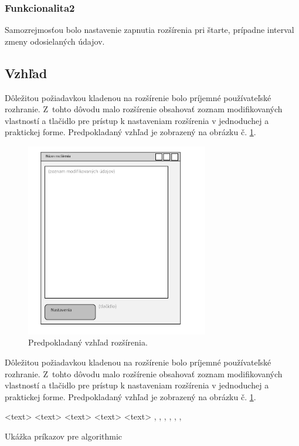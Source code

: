 \subsubsection{Funkcionalita2}
\noindent Samozrejmosťou bolo nastavenie zapnutia rozšírenia pri štarte, prípadne interval zmeny odosielaných údajov.

\subsection{Vzhľad}
\noindent Dôležitou požiadavkou kladenou na rozšírenie bolo príjemné používateľské rozhranie. Z~tohto dôvodu malo rozšírenie obsahovať zoznam modifikovaných vlastností a tlačidlo pre prístup k nastaveniam rozšírenia v jednoduchej a praktickej forme. Predpokladaný vzhľad je zobrazený na obrázku č. \ref{vzhladobr}.
\begin{figure}[!htbp]
  \centering
  \includegraphics[width=8cm]{img/vzhlad.png}
  \caption{Predpokladaný vzhľad rozšírenia.}
  \label{vzhladobr}
\end{figure}	 
\noindent Dôležitou požiadavkou kladenou na rozšírenie bolo príjemné používateľské rozhranie.\cite{t00} Z~tohto dôvodu malo rozšírenie obsahovať zoznam modifikovaných vlastností a tlačidlo pre prístup k nastaveniam rozšírenia v jednoduchej a praktickej forme. Predpokladaný vzhľad je zobrazený na obrázku č. \ref{vzhladobr}.

\begin{algorithm}
\scriptsize
\begin{algorithmic}
 \STATE <text>
   \ELSE {} \ENDIF
     \ENDIF
   \ENDFOR
   \ENDFOR
   \ENDFOR
   \ENDWHILE
 \REPEAT {} 
 \LOOP {} \ENDLOOP
 \REQUIRE <text>
 \ENSURE <text>
 \RETURN <text>
 \PRINT <text>
 \AND, \OR, \XOR, \NOT, \TO, \TRUE, \FALSE
\end{algorithmic}
\caption{Ukážka príkazov pre algorithmic}  
\label{alg:preview}  
\end{algorithm}

